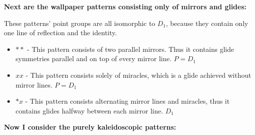 \documentclass{article}
\begin{document}
\textbf{Next are the wallpaper patterns consisting only of mirrors and glides:}

These patterns' point groups are all isomorphic to $D_1$, because they contain only one line of reflection and the identity. 
\begin{itemize}
\item$**$ - This pattern consists of two parallel mirrors. Thus it contains glide symmetries parallel and on top of every mirror line. $P = D_1$
\item$xx$ - This pattern consists solely of miracles, which is a glide achieved without mirror lines. $P = D_1$
\item$*x$ - This pattern consists alternating mirror lines and miracles, thus it contains glides halfway between each mirror line.  $D_1$
\end{itemize}

\textbf{Now I consider the purely kaleidoscopic patterns:}
\end{document}
